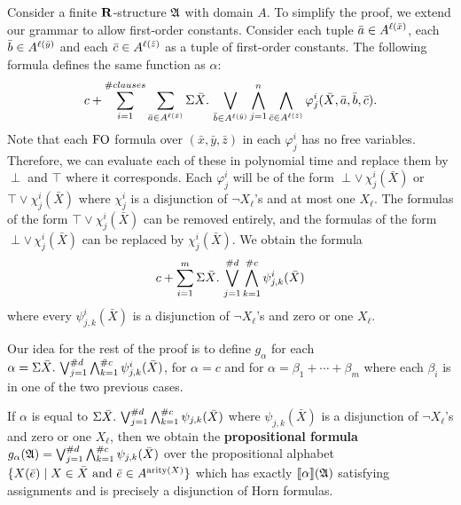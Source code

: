 Consider a finite $\mathbf{R}$-structure $\mathfrak{A}$ with domain $A$. To simplify the proof, we extend our grammar to allow first-order constants. Consider each tuple $\bar{a}\in A^{\ell(\bar{x})}$, each $\bar{b}\in A^{\ell(\bar{y})}$ and each $\bar{c}\in A^{\ell(\bar{z})}$ as a tuple of first-order constants. The following formula defines the same function as $\alpha$:
$$
c + \sum_{i = 1}^{\#clauses} \sum_{\bar{a}\in A^{\ell(\bar{x})}} \Sigma{\bar{X}}.\,\bigvee_{\bar{b}\in A^{\ell(\bar{y})}}\bigwedge_{j = 1}^{n}\bigwedge_{\bar{c}\in A^{\ell(\bar{z})}}\varphi^i_j(\bar{X},\bar{a},\bar{b},\bar{c}).
$$
Note that each ${\rm FO}$ formula over $(\bar{x},\bar{y},\bar{z})$ in each $\varphi^i_j$ has no free variables. Therefore, we can evaluate each of these in polynomial time and replace them by $\perp$ and $\top$ where it corresponds. Each $\varphi^i_j$ will be of the form $\perp \vee\, \chi^i_j(\bar{X})$ or $\top \vee \chi^i_j(\bar{X})$ where $\chi^i_j$ is a disjunction of $\neg X_{\ell}$'s and at most one $X_{\ell}$. The formulas of the form $\top \vee \chi^i_j(\bar{X})$ can be removed entirely, and the formulas of the form $\perp \vee\, \chi^i_j(\bar{X})$ can be replaced by $\chi^i_j(\bar{X})$. We obtain the formula
$$
c + \sum_{i = 1}^{m}\Sigma{\bar{X}}.\,\bigvee_{j = 1}^{\#d}\bigwedge_{k = 1}^{\#c}\psi^{i}_{j,k}(\bar{X})
$$
where every $\psi^{i}_{j,k}(\bar{X})$ is a disjunction of $\neg X_{\ell}$'s and zero or one $X_{\ell}$.

Our idea for the rest of the proof is to define $g_{\alpha}$ for each $\alpha = \Sigma{\bar{X}}.\,\bigvee_{j = 1}^{\#d}\bigwedge_{k = 1}^{\#c}\psi^{i}_{j,k}(\bar{X})$, for $\alpha = c$ and for $\alpha = \beta_1 + \cdots + \beta_m$ where each $\beta_i$ is in one of the two previous cases.

If $\alpha$ is equal to $\Sigma{\bar{X}}.\,\bigvee_{j = 1}^{\#d}\bigwedge_{k = 1}^{\#c}\psi_{j,k}(\bar{X})$ where $\psi_{j,k}(\bar{X})$ is a disjunction of $\neg X_{\ell}$'s and zero or one $X_{\ell}$, then we obtain the {\bf propositional formula} $g_{\alpha}(\mathfrak{A}) = \bigvee_{j = 1}^{\#d}\bigwedge_{k = 1}^{\#c}\psi_{j,k}(\bar{X})$ over the propositional alphabet $\{X(\bar{e}) \mid X \in \bar{X} \text{ and } \bar{e}\in A^{{\rm arity}(X)} \}$ which has exactly ${\llbracket{}{\alpha}\rrbracket}(\mathfrak{A})$ satisfying assignments and is precisely a disjunction of Horn formulas.

